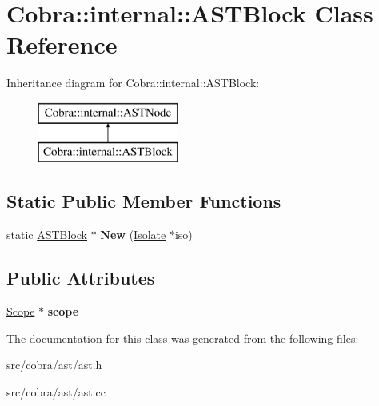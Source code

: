 \hypertarget{class_cobra_1_1internal_1_1_a_s_t_block}{\section{Cobra\+:\+:internal\+:\+:A\+S\+T\+Block Class Reference}
\label{class_cobra_1_1internal_1_1_a_s_t_block}
}
Inheritance diagram for Cobra\+:\+:internal\+:\+:A\+S\+T\+Block\+:\begin{figure}[H]
\begin{center}
\leavevmode
\includegraphics[height=2.000000cm]{class_cobra_1_1internal_1_1_a_s_t_block}
\end{center}
\end{figure}
\subsection*{Static Public Member Functions}
\begin{DoxyCompactItemize}
\item 
\hypertarget{class_cobra_1_1internal_1_1_a_s_t_block_a6f071f391f1a2be53293775ea8305b2a}{static \hyperlink{class_cobra_1_1internal_1_1_a_s_t_block}{A\+S\+T\+Block} $\ast$ {\bfseries New} (\hyperlink{class_cobra_1_1internal_1_1_isolate}{Isolate} $\ast$iso)}\label{class_cobra_1_1internal_1_1_a_s_t_block_a6f071f391f1a2be53293775ea8305b2a}

\end{DoxyCompactItemize}
\subsection*{Public Attributes}
\begin{DoxyCompactItemize}
\item 
\hypertarget{class_cobra_1_1internal_1_1_a_s_t_block_a738bd59c10dea2aef7d0bfed7da854a9}{\hyperlink{class_cobra_1_1internal_1_1_scope}{Scope} $\ast$ {\bfseries scope}}\label{class_cobra_1_1internal_1_1_a_s_t_block_a738bd59c10dea2aef7d0bfed7da854a9}

\end{DoxyCompactItemize}


The documentation for this class was generated from the following files\+:\begin{DoxyCompactItemize}
\item 
src/cobra/ast/ast.\+h\item 
src/cobra/ast/ast.\+cc\end{DoxyCompactItemize}
